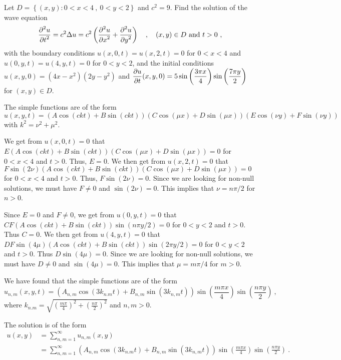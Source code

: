 \begin{egg}
Let $D =\left\{ (x,y) : 0 < x < 4 \ ,\ 0 < y < 2 \right\}$ and
$c^2 = 9$.  Find the solution of the wave equation
\[
\frac{\displaystyle \partial^{2}{u}} {\displaystyle \partial t^{2}} = c^2 \Delta u = c^2 \left(\frac{\displaystyle \partial^{2}{u}} {\displaystyle \partial x^{2}} +
\frac{\displaystyle \partial^{2}{u}} {\displaystyle \partial y^{2}}\right) \quad , \quad (x,y) \in D\ \text{and}\ t > 0 \ ,
\]
with the boundary conditions
$u(x,0,t) = u(x,2,t) = 0$ for $0<x<4$ and
$u(0,y,t) = u(4,y,t) = 0$ for $0<y<2$,
and the initial conditions
$u(x,y,0) = (4x-x^2)(2y-y^2)$ and
$\displaystyle \frac{\partial{u}}{\partial t}(x,y,0) = 5\sin\left(\frac{3\pi x}{4}\right)
\sin\left(\frac{7\pi y}{2}\right)$ for $(x,y) \in D$.

The simple functions are of the form
\[
u(x,y,t) = \left(A \cos (ckt) + B \sin (ckt)\right)
\left(C \cos (\mu x) + D \sin (\mu x)\right)
\left(E \cos (\nu y) + F \sin (\nu y)\right)
\]
with $k^2 = \nu^2 + \mu^2$.

We get from $u(x,0,t) = 0$ that
$\displaystyle E\left(A \cos (ckt) + B \sin (ckt)\right)\left(C \cos (\mu x)
+ D \sin (\mu x)\right)=0$ for $0<x<4$ and $t>0$.
Thus, $E=0$.  We then get from $u(x,2,t) =0$ that\\
$F\sin(2\nu) \left(A \cos (ckt) + B \sin (ckt)\right)
\left(C \cos (\mu x) + D \sin (\mu x)\right)= 0$
for $0<x<4$ and $t>0$.
Thus, $F\sin(2\nu)=0$.  Since we are looking for non-null
solutions, we must have $F\neq 0$ and $\sin(2\nu)=0$.  This implies
that $\nu = n\pi/2$ for $n>0$.

Since $E=0$ and $F\neq 0$, we get from $u(0,y,t) = 0$ that \\
$C F \left(A \cos (ckt) + B \sin (ckt)\right) \sin (n\pi y/2)=0$
for $0<y<2$ and $t>0$.  Thus $C=0$.  We then get
from $u(4,y,t) =0$ that
$D F \sin (4\mu)\left(A \cos (ckt) + B \sin (ckt)\right) \sin (2\pi y/2)= 0$
for $0<y<2$ and $t>0$.  Thus $D\sin(4\mu)=0$.  Since
we are looking for non-null solutions, we must have $D\neq 0$ and
$\sin(4\mu)=0$.  This implies that $\mu = m\pi/4$ for $m>0$.

We have found that the simple functions are of the form
\[
u_{n,m}(x,y,t) = \left(A_{n,m} \cos (3 k_{n.m} t) +
B_{n,m} \sin (3 k_{n,m} t)\right)\sin\left(\frac{m\pi x}{4}\right)
\sin\left(\frac{n\pi y}{2}\right) \  ,
\]
where $\displaystyle k_{n.m} =
\sqrt{\left(\frac{m\pi}{4}\right)^2 + \left(\frac{n\pi}{2}\right)^2}$
and $n,m >0$.

The solution is of the form
\begin{align*}
u(x,y) &= \sum_{n,m=1}^\infty u_{n,m}(x,y) \\
&= \sum_{n,m=1}^\infty \left(A_{n,m} \cos (3 k_{n.m} t) +
B_{n,m} \sin (3 k_{n,m} t)\right)\sin\left(\frac{m\pi x}{4}\right)
\sin\left(\frac{n\pi y}{2}\right) \ .
\end{align*}


\end{egg}
